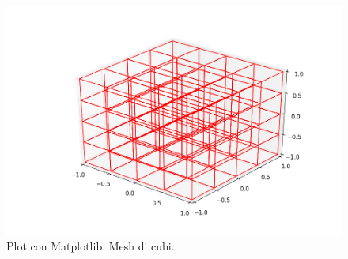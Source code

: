 \documentclass[oneside,12pt]{book}  %
\theoremstyle{plain}
\theoremstyle{definition}
\theoremstyle{remark}
\numberwithin{equation}{chapter} %
\begin{document}
\begin{figure}[h]
\label{img:matplotlibMesh}
\centering
\includegraphics[scale=0.4]{Immagini/Project/matplotlibPlotMesh.png}
\caption{Plot con Matplotlib. Mesh di cubi.}
\end{figure}







\end{document}
